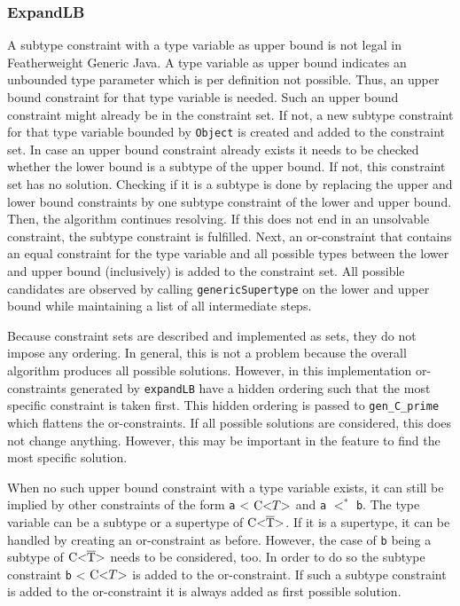 \subsubsection{ExpandLB}
A subtype constraint with a type variable as upper bound is not legal in Featherweight Generic Java. A type variable as upper bound indicates an unbounded type parameter which is per definition not possible.
Thus, an upper bound constraint for that type variable is needed. Such an upper bound constraint might already be in the constraint set. If not, a new subtype constraint for that type variable bounded by \verb|Object| is created and added to the constraint set.
In case an upper bound constraint already exists it needs to be checked whether the lower bound is a subtype of the upper bound. If not, this constraint set has no solution. Checking if it is a subtype is done by replacing the upper and lower bound constraints by one subtype constraint of the lower and upper bound. Then, the algorithm continues resolving. If this does not end in an unsolvable constraint, the subtype constraint is fulfilled.
Next, an or-constraint that contains an equal constraint for the type variable and all possible types between the lower and upper bound (inclusively) is added to the constraint set. All possible candidates are observed by calling \verb|genericSupertype| on the lower and upper bound while maintaining a list of all intermediate steps.

Because constraint sets are described and implemented as sets, they do not impose any ordering. In general, this is not a problem because the overall algorithm produces all possible solutions. However, in this implementation or-constraints generated by \verb|expandLB| have a hidden ordering such that the most specific constraint is taken first.
This hidden ordering is passed to \verb|gen_C_prime| which flattens the or-constraints. If all possible solutions are considered, this does not change anything.
However, this may be important in the feature to find the most specific solution.

When no such upper bound constraint with a type variable exists, it can still be implied by other constraints of the form \verb|a| < $\text{C} \text{<} T \text{>}$ and \verb|a| $<^*$ \verb|b|. The type variable can be a subtype or a supertype of $\text{C<}\overline{\text{T}}\text{>}$. If it is a supertype, it can be handled by creating an or-constraint as before. However, the case of \verb|b| being a subtype of $\text{C<}\overline{\text{T}}\text{>}$ needs to be considered, too.
In order to do so the subtype constraint \verb|b| < $\text{C} \text{<} T \text{>}$ is added to the or-constraint. If such a subtype constraint is added to the or-constraint it is always added as first possible solution.

